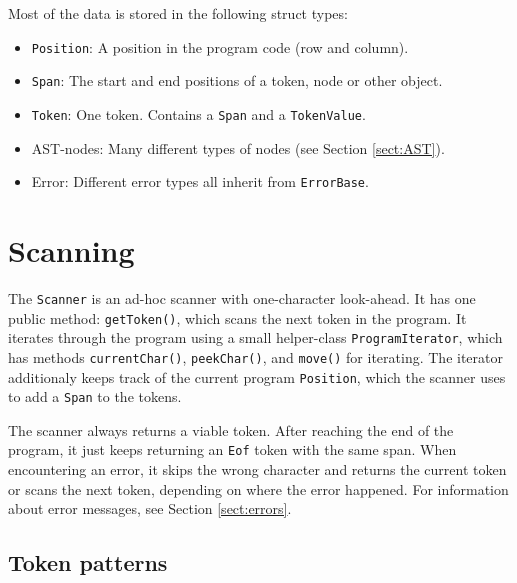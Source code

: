 \documentclass[a4paper]{article}
\newcommand*{\code}[1]{\texttt{#1}}
\begin{document}
Most of the data is stored in the following struct types:
\begin{itemize}
  \item \code{Position}: A position in the program code (row and column).
  \item \code{Span}: The start and end positions of a token, node or other object.
  \item \code{Token}: One token. Contains a \code{Span} and 
  a \code{TokenValue}.
  \item AST-nodes: Many different types of nodes 
        (see Section \ref{sect:AST}).
  \item Error: Different 
  error types all inherit from \code{ErrorBase}.
\end{itemize}



\clearpage
\section{Scanning}

The \code{Scanner} is an ad-hoc scanner with one-character look-ahead.
It has one public method: \code{getToken()}, which scans the next token 
in the program.
It iterates through the program using a small helper-class 
\code{ProgramIterator}, which has methods \code{currentChar()}, 
\code{peekChar()}, and \code{move()} for iterating. The 
iterator additionaly keeps track of the current program \code{Position}, 
which the scanner uses to add a \code{Span} to the tokens.

The scanner always returns a viable token. After reaching the 
end of the program, it just keeps returning an \code{Eof} token 
with the same span. When encountering an error, it skips the 
wrong character and returns the current token or scans the next token, 
depending on where the error happened. For information about 
error messages, see Section \ref{sect:errors}.


\subsection{Token patterns}
\end{document}
